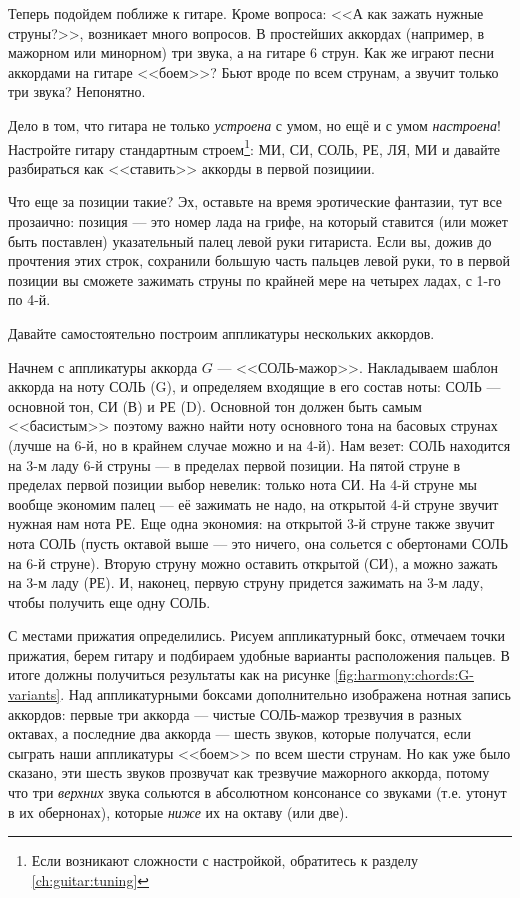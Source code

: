 Теперь подойдем поближе к гитаре. Кроме вопроса: <<А как зажать нужные струны?>>, возникает много вопросов. В простейших аккордах (например, в мажорном или минорном) три звука, а на гитаре 6 струн. Как же играют песни аккордами на гитаре <<боем>>? Бьют вроде по всем струнам, а звучит только три звука? Непонятно.

Дело в том, что гитара не только \emph{устроена} с умом, но ещё и с умом \emph{настроена}! Настройте гитару стандартным строем\footnote{Если возникают сложности с настройкой, обратитесь к разделу \ref{ch:guitar:tuning}}: МИ, СИ, СОЛЬ, РЕ, ЛЯ, МИ и давайте разбираться как <<ставить>> аккорды в первой позициии.

Что еще за позиции такие? Эх, оставьте на время эротические фантазии, тут все прозаично: позиция --- это номер лада на грифе, на который ставится (или может быть поставлен) указательный палец левой руки гитариста. Если вы, дожив до прочтения этих строк, сохранили большую часть пальцев левой руки, то в первой позиции вы сможете зажимать струны по крайней мере на четырех ладах, с 1-го по 4-й. 

Давайте самостоятельно построим аппликатуры нескольких аккордов. 

Начнем с аппликатуры аккорда $G$ --- <<СОЛЬ-мажор>>. Накладываем шаблон аккорда на ноту СОЛЬ (G), и определяем входящие в его состав ноты: СОЛЬ --- основной тон, СИ (В) и РЕ (D). Основной тон должен быть самым <<басистым>> поэтому важно найти ноту основного тона на басовых струнах (лучше на 6-й, но в крайнем случае можно и на 4-й). Нам везет: СОЛЬ находится на 3-м ладу 6-й струны --- в пределах первой позиции. На пятой струне в пределах первой позиции выбор невелик: только нота СИ. На 4-й струне мы вообще экономим палец --- её зажимать не надо, на открытой 4-й струне звучит нужная нам нота РЕ. Еще одна экономия: на открытой 3-й струне также звучит нота СОЛЬ (пусть октавой выше --- это ничего, она сольется с обертонами СОЛЬ на 6-й струне). Вторую струну можно оставить открытой (СИ), а можно зажать на 3-м ладу (РЕ). И, наконец, первую струну придется зажимать на 3-м ладу, чтобы получить еще одну СОЛЬ.

С местами прижатия определились. Рисуем аппликатурный бокс, отмечаем точки прижатия, берем гитару и подбираем удобные варианты расположения пальцев. В итоге должны получиться результаты как на рисунке \ref{fig:harmony:chords:G-variants}. Над аппликатурными боксами дополнительно изображена нотная запись аккордов: первые три аккорда --- чистые СОЛЬ-мажор трезвучия в разных октавах, а последние два аккорда --- шесть звуков, которые получатся, если сыграть наши аппликатуры <<боем>> по всем шести струнам. Но как уже было сказано, эти шесть звуков прозвучат как трезвучие мажорного аккорда, потому что три \emph{верхних} звука сольются в абсолютном консонансе со звуками (т.е. утонут в их обернонах), которые \emph{ниже} их на октаву (или две).

